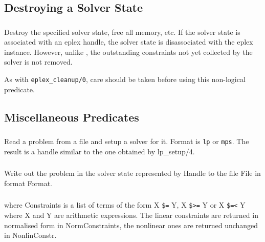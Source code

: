\subsection{Destroying a Solver State}
\subsubsection{}

Destroy the specified solver state, free all memory, etc. If the solver
state is associated with an eplex handle, the solver state is disassociated
with the eplex instance. However, unlike , the
outstanding constraints not yet collected by the solver is not removed.

As with {\tt eplex_cleanup/0}, care should be taken before using this
non-logical predicate. 

\subsection{Miscellaneous Predicates}
\subsubsection{}

Read a problem from a file and setup a solver for it.  Format is
{\tt lp} or {\tt mps}.
The result is a handle similar to the one obtained by lp_setup/4.
\subsubsection{}

Write out the problem in the solver state represented by Handle to the file
File in format Format.

\subsubsection{}
where Constraints is a list of terms of the form
X \verb.$=. Y, X \verb.$>=. Y or X \verb.$=<. Y 
where X and Y are arithmetic expressions.
The linear constraints are returned in normalised form in NormConstraints,
the nonlinear ones are returned unchanged in NonlinConstr.

